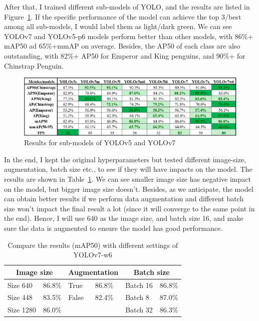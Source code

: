 \documentclass[runningheads]{llncs}
\begin{document}
After that, I trained different sub-models of YOLO, and the results are listed in Figure~\ref{fig1}. If the specific performance of the model can achieve the top 3/best among all sub-models, I would label them as light/dark green. We can see YOLOv7 and YOLOv5-p6 models perform better than other models, with 86\%+ mAP50 ad 65\%+mmAP on average. Besides, the AP50 of each class are also outstanding, with 82\%+ AP50 for Emperor and King penguins, and 90\%+ for Chinstrap Penguin.

\begin{figure}
\includegraphics[width=\textwidth]{result.eps}
\caption{Results for sub-models of YOLOv5 and YOLOv7} \label{fig1}
\end{figure}


In the end, I kept the original hyperparameters but tested different image-size, augmentation, batch size etc., to see if they will have impacts on the model. The results are shown in Table~\ref{tab2}. We can see smaller image size has negative impact on the model, but bigger image size doesn't. Besides, as we anticipate, the model can obtain better results if we perform data augmentation and different batch size won't impact the final result a lot (since it will converge to the same point in the end). Hence, I will use 640 as the image size, and batch size 16, and make sure the data is augmented to ensure the model has good performance.
\begin{table}
\centering
\caption{Compare the results (mAP50) with different settings of YOLOv7-w6}\label{tab2}
\begin{tabular}{p{2cm}p{1cm}|p{1.2cm}p{1cm}|p{2cm}p{1cm}}
\hline
\multicolumn{2}{c}{\textbf{Image size}} & \multicolumn{2}{c}{\textbf{Augmentation}} & \multicolumn{2}{c}{\textbf{Batch size}} \\
\hline
Size 640 & 86.8\% &  True & 86.8\% &  Batch 16 & 86.8\% \\
Size 448 & 83.5\% &  False & 82.4\% &  Batch 8 & 87.0\% \\
Size 1280 & 86.0\% &   &  &  Batch 32 & 86.3\% \\
\hline
\end{tabular}
\end{table}
\end{document}
